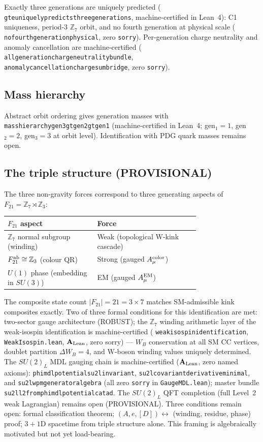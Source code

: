 \documentclass[11pt]{article}
\theoremstyle{remark}
\newcommand{\ZS}{\mathbb{Z}_7}
\newcommand{\Zthree}{\mathbb{Z}_3}
\newcommand{\lean}[1]{%
  \penalty-100
  \begingroup\def\_{\textunderscore\allowbreak}\texttt{#1}\endgroup}
\newcommand{\Ftwentyone}{F_{21}}
\newcommand{\CatAL}{\ensuremath{\textbf{A}_{\rm Lean}}}
\begin{document}
Exactly three generations are uniquely predicted
(\lean{gte\_uniquely\_predicts\_three\_generations}, machine-certified in Lean~4):
C1 uniqueness, period-3 $\ZS$ orbit, and no fourth generation at physical scale
(\lean{no\_fourth\_generation\_physical}, zero \texttt{sorry}).
Per-generation charge neutrality and anomaly cancellation are machine-certified
(\lean{all\_generation\_charge\_neutrality\_bundle},
\lean{anomaly\_cancellation\_charge\_sum\_bridge}, zero \texttt{sorry}).

\subsection{Mass hierarchy}

Abstract orbit ordering gives generation masses with
\lean{mass\_hierarchy\_gen3\_gt\_gen2\_gt\_gen1} (machine-certified in Lean~4;
gen$_1 = 1$, gen$_2 = 2$, gen$_3 = 3$ at orbit level).
Identification with PDG quark masses remains open.

\subsection{The triple structure (PROVISIONAL)}

The three non-gravity forces correspond to three generating aspects of
$\Ftwentyone = \ZS \rtimes \Zthree$:
\begin{center}
\small
\begin{tabular}{@{}P{0.35\linewidth}P{0.40\linewidth}@{}}
\toprule
\textbf{$\Ftwentyone$ aspect} & \textbf{Force} \\
\midrule
$\ZS$ normal subgroup (winding) & Weak (topological W-kink cascade) \\
$\Ftwentyone^{\rm ab} \cong \Zthree$ (colour QR) & Strong (gauged $A_\mu^{\rm color}$) \\
$U(1)$ phase (embedding in $SU(3)$) & EM (gauged $A_\mu^{\rm EM}$) \\
\bottomrule
\end{tabular}
\end{center}
The composite state count $|\Ftwentyone| = 21 = 3 \times 7$ matches SM-admissible
kink composites exactly.
Two of three formal conditions for this identification are met:
two-sector gauge architecture (ROBUST); the $\ZS$ winding arithmetic layer
of the weak-isospin identification is machine-certified
(\lean{weak\_isospin\_identification}, \texttt{WeakIsospin.lean}, $\CatAL$, zero sorry) ---
$W_B$ conservation at all SM CC vertices, doublet partition $\Delta W_B = 4$, and
W-boson winding values uniquely determined.
The $SU(2)_L$ MDL gauging chain is machine-certified ($\CatAL$, zero named axioms):
\lean{phimdl\_potential\_su2l\_invariant},
\lean{su2l\_covariant\_derivative\_minimal}, and
\lean{su2l\_wpm\_generator\_algebra} (all zero \texttt{sorry} in
\texttt{GaugeMDL.lean}); master bundle
\lean{su2l\_l2\_from\_phimdl\_potential\_catad}.
The $SU(2)_L$ QFT completion (full Level~2 weak Lagrangian) remains open (PROVISIONAL).
Three conditions remain open: formal classification theorem;
$(A,e,[D]) \leftrightarrow$ (winding, residue, phase) proof;
$3+1$D spacetime from triple structure alone.
This framing is algebraically motivated but not yet load-bearing.
\end{document}
